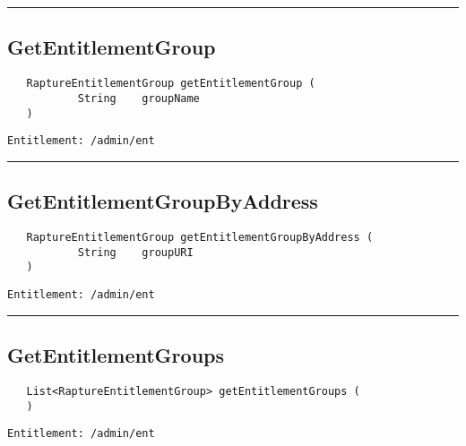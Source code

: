 \rule{12cm}{2pt}
\subsection{GetEntitlementGroup}
\label{Api:GetEntitlementGroup}
\begin{Verbatim}
   RaptureEntitlementGroup getEntitlementGroup (
           String    groupName
   )
\end{Verbatim}
\begin{Verbatim}[formatcom=\color{Maroon}]
  Entitlement: /admin/ent
\end{Verbatim}



\rule{12cm}{2pt}
\subsection{GetEntitlementGroupByAddress}
\label{Api:GetEntitlementGroupByAddress}
\begin{Verbatim}
   RaptureEntitlementGroup getEntitlementGroupByAddress (
           String    groupURI
   )
\end{Verbatim}
\begin{Verbatim}[formatcom=\color{Maroon}]
  Entitlement: /admin/ent
\end{Verbatim}



\rule{12cm}{2pt}
\subsection{GetEntitlementGroups}
\label{Api:GetEntitlementGroups}
\begin{Verbatim}
   List<RaptureEntitlementGroup> getEntitlementGroups (
   )
\end{Verbatim}
\begin{Verbatim}[formatcom=\color{Maroon}]
  Entitlement: /admin/ent
\end{Verbatim}



